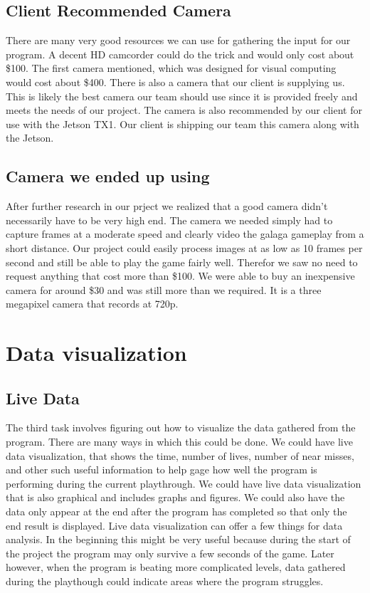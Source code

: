 \subsection{Client Recommended Camera}
There are many very good resources we can use for gathering the input for our program.
A decent HD camcorder could do the trick and would only cost about \$100.
The first camera mentioned, which was designed for visual computing would cost about \$400.
There is also a camera that our client is supplying us.
This is likely the best camera our team should use since it is provided freely and meets the needs of our project.
The camera is also recommended by our client for use with the Jetson TX1.
Our client is shipping our team this camera along with the Jetson.

\subsection{Camera we ended up using}
After further research in our prject we realized that a good camera didn't necessarily have to be very high end.
The camera we needed simply had to capture frames at a moderate speed and clearly video the galaga gameplay from a short distance.
Our project could easily process images at as low as 10 frames per second and still be able to play the game fairly well.
Therefor we saw no need to request anything that cost more than \$100.
We were able to buy an inexpensive camera for around \$30 and was still more than we required.
It is a three megapixel camera that records at 720p.

\section{Data visualization}
\subsection{Live Data}
The third task involves figuring out how to visualize the data gathered from the program.
There are many ways in which this could be done.
We could have live data visualization, that shows the time, number of lives, number of near misses, and other such useful information to help gage how well the program is performing during the current playthrough.
We could have live data visualization that is also graphical and includes graphs and figures.
We could also have the data only appear at the end after the program has completed so that only the end result is displayed.
Live data visualization can offer a few things for data analysis.
In the beginning this might be very useful because during the start of the project the program may only survive a few seconds of the game.
Later however, when the program is beating more complicated levels, data gathered during the playthough could indicate areas where the program struggles.

